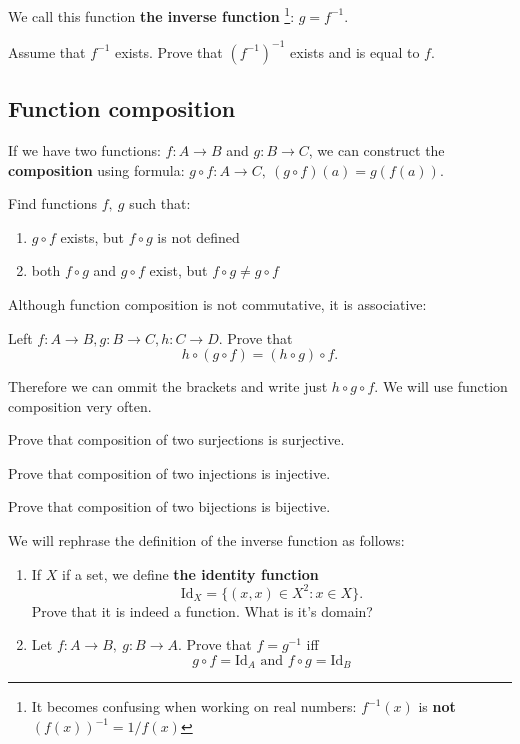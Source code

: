 \noindent We call this function \textbf{the inverse function}
\footnote{It becomes confusing when working on real numbers: $f^{-1}(x)$ is 
\textbf{not} $(f(x))^{-1}=1/f(x)$}: $g=f^{-1}.$

\begin{prob}
	Assume that $f^{-1}$ exists. Prove that $(f^{-1})^{-1}$ exists and is equal to $f$.
\end{prob}

\subsection{Function composition}
If we have two functions: $f:A\to B$ and $g: B\to C$, we can construct the \textbf{composition} using formula:
$g\circ f: A\to C,~(g\circ f)(a) = g(f(a)).$

\begin{prob}
	Find functions $f,~g$ such that:
	\begin{enumerate}
		\item $g\circ f$ exists, but $f\circ g$ is not defined
		\item both $f\circ g$ and $g\circ f$ exist, but $f\circ g\neq g\circ f$
	\end{enumerate}
\end{prob}

\noindent Although function composition is not commutative, it is associative:
\begin{prob}
	Left $f:A\to B, g: B\to C, h: C\to D$. Prove that
	$$h\circ (g\circ f) = (h\circ g)\circ f.$$
\end{prob}
Therefore we can ommit the brackets and write just $h\circ g\circ f.$ We will use function composition very
often.

\begin{prob}
	\item Prove that composition of two surjections is surjective.
	\item Prove that composition of two injections is injective.
	\item Prove that composition of two bijections is bijective.
\end{prob}

\begin{prob} We will rephrase the definition of the inverse function as follows:
	\begin{enumerate}
		\item If $X$ if a set, we define \textbf{the identity function} 
			$$\text{Id}_X=\{(x,x)\in X^2 : x\in X\}.$$
			Prove that it is indeed a function. What is it's domain?
		\item Let $f:A\to B,~g:B\to A$. Prove that $f=g^{-1}$ iff
			$$g\circ f = \text{Id}_A \text{ and } f\circ g = \text{Id}_B$$
	\end{enumerate}
\end{prob}

